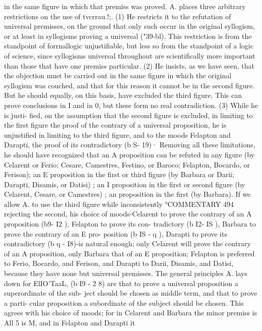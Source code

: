 {{{{{{{{{{{{{{{{{{{{{{{{{{{{{in the same figure in which that premiss was proved.
A. places three arbitrary restrictions on the use of tvcrrau.!;.
(1) He restricts it to the refutation of universal premisses, on the
ground that only such occur in the original syllogism, or at least
in syllogisms proving a universal ("39-bl). This restriction is
from the standpoint of forrnallogic unjustifiable, but less so from
the standpoint of a logic of science, since syllogisms universal
throughout are scientifically more important than those that
have one premiss particular. (2) He insists, as we have seen, that
the objection must be carried out in the same figure in which the
original syllogism was couched, and that for this reason it cannot
be in the second figure. But he should equally, on this basis, have
excluded the third figure. This can prove conclusions in I and
in 0, but these form no real contradiction. (3) While he is justi-
fied, on the assumption that the second figure is excluded, in
limiting to the first figure the proof of the contrary of a universal
proposition, he is unjustified in limiting to the third figure, and
to the moods Felapton and Darapti, the proof of its contradictory
(b S- 19)·
Removing all these limitations, he should have recognized that
an A proposition can be refuted in any figure (by Celarent or
Ferio; Cesare, Camestres, Festino, or Baroco; Felapton, Bocardo,
or Ferison); an E proposition in the first or third figure (by
Barbara or Darii; Darapti, Disamis, or Datisi) ; an I proposition
in the first or second figure (by Celarent, Cesare, or Camestres) ;
an proposition in the first (by Barbara).
If we allow A. to use the third figure while inconsistently
°COMMENTARY
494
rejecting the second, his choice of moods-Celarent to prove the
contrary of an A proposition (b9- I2 ), Felapton to prove its con-
tradictory (b I2- IS ), Barbara to prove the contrary of an E pro-
position (b IS - q ), Darapti to prove its contradictory (b q - I8)-is
natural enough; only Celarent will prove the contrary of an A
proposition, only Barbara that of an E proposition; Felapton
is preferred to Ferio, Bocardo, and Ferison, and Darapti to Darii,
Disamis, and Datisi, because they have none but universal
premisses.
The general principles A. lays down for ElIO'TaaL, (b I9 - 2 8) are
that to prove a universal proposition a superordinate of the sub-
ject should be chosen as middle term, and that to prove a parti-
cular proposition a subordinate of the subject should be chosen.
This agrees with his choice of moods; for in Celarent and Barbara
the minor premiss is All 5 is M, and in Felapton and Darapti it
}}}}}}}}}}}}}}}}}}}}}}}}}}}}}
